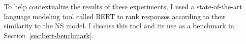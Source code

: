 


To help contextualize the results of these experiments, I used a state-of-the-art language modeling tool called BERT to rank responses according to their similarity to the NS model. I discuss this tool and its use as a benchmark in Section~\ref{sec:bert-benchmark}.


